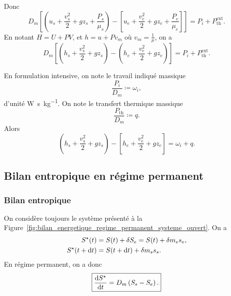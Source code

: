             Donc
            \begin{equation}
                D_m\left[\left(u_s+\frac{v_s^{2}}{2}+g z_s+\frac{P_s}{\mu_s}\right)-\left[u_e+\frac{v_e^{2}}{2}+g z_e+\frac{P_e}{\mu_e}\right]\right]=P_i+P_{\text{th}}^{\text{ext}}.
            \end{equation}
            En notant $H=U+PV$, et $h=u+Pv_m$ où $v_m=\frac{1}{\mu}$, on a
            \begin{equation}
                \boxed{
                    D_m\left[\left(h_s+\frac{v_s^{2}}{2}+g z_s\right)-\left(h_e+\frac{v_e^{2}}{2}+g z_e\right)\right]=P_i+P_{\text{th}}^{\text{ext}}.
                }
            \end{equation}

            En formulation intensive, on note le travail indiqué massique
            \begin{equation}
                \boxed{
                    \frac{P_i}{D_m}\coloneqq\omega_i,
                }
            \end{equation}
            d'unité \si[]{\watt\second\per\kilogram}. On note le transfert thermique massique 
            \begin{equation}
                \boxed{
                    \frac{P_{\text{th}}}{D_m}\coloneqq q.
                }
            \end{equation}
            Alors
            \begin{equation}
                \left(h_s+\frac{v_s^{2}}{2}+g z_s\right)-\left[h_e+\frac{v_e^{2}}{2}+g z_e\right]=\omega_i+q.
            \end{equation}

    \subsection{Bilan entropique en régime permanent}
        
        \subsubsection{Bilan entropique}
            
            On considère toujours le système présenté à la Figure~\ref{fig:bilan_energetique_regime_permanent_systeme_ouvert}. On a 
            \begin{equation}
                \begin{aligned}
                    S^{\star}(t)&= S(t)+\delta S_e=S(t)+\delta m_e s_e,\\
                    S^{\star}(t+\mathrm{d} t)&= S(t+\mathrm{d} t)+\delta m_s s_s.
                \end{aligned}
            \end{equation}
            En régime permanent, on a donc
            \begin{equation}
                \boxed{
                    \frac{\mathrm{d} S^{\star}}{\mathrm{d} t}=D_m\left(S_s-S_e\right).
                }
            \end{equation}


